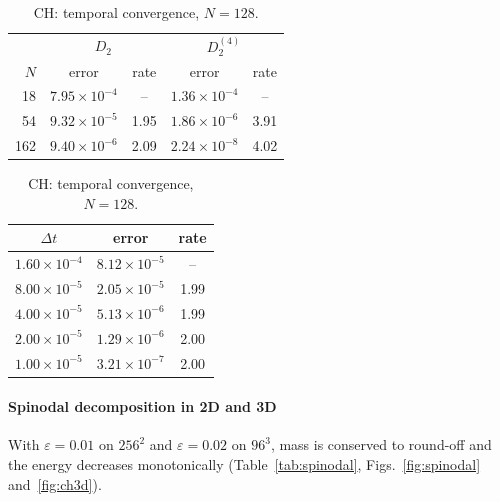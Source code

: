 \documentclass[preprint,12pt]{elsarticle}
\theoremstyle{remark}
\begin{document}
\begin{table}[t]\centering\footnotesize
\begin{minipage}{0.52\textwidth}\centering
\caption{CH: spatial self-convergence (max norm).}\label{tab:chspace}
\begin{tabular}{r cc cc}
\toprule
 & \multicolumn{2}{c}{$D_2$} & \multicolumn{2}{c}{$D_2^{(4)}$}\\
$N$ & error & rate & error & rate\\
\midrule
18 & $7.95\times10^{-4}$ & -- & $1.36\times10^{-4}$ & --\\
54 & $9.32\times10^{-5}$ & 1.95 & $1.86\times10^{-6}$ & 3.91\\
162 & $9.40\times10^{-6}$ & 2.09 & $2.24\times10^{-8}$ & 4.02\\
\bottomrule
\end{tabular}
\end{minipage}\hfill
\begin{minipage}{0.42\textwidth}\centering
\caption{CH: temporal convergence, $N=128$.}\label{tab:chtime}
\begin{tabular}{c cc}
\toprule
$\Delta t$ & error & rate\\
\midrule
$1.60\times10^{-4}$ & $8.12\times10^{-5}$ & --\\
$8.00\times10^{-5}$ & $2.05\times10^{-5}$ & 1.99\\
$4.00\times10^{-5}$ & $5.13\times10^{-6}$ & 1.99\\
$2.00\times10^{-5}$ & $1.29\times10^{-6}$ & 2.00\\
$1.00\times10^{-5}$ & $3.21\times10^{-7}$ & 2.00\\
\bottomrule
\end{tabular}
\end{minipage}
\end{table}

\paragraph{Spinodal decomposition in 2D and 3D} With $\varepsilon=0.01$ on $256^2$ and $\varepsilon=0.02$ on
$96^3$, mass is conserved to round-off and the energy decreases monotonically
(Table~\ref{tab:spinodal}, Figs.~\ref{fig:spinodal} and~\ref{fig:ch3d}).
\end{document}

